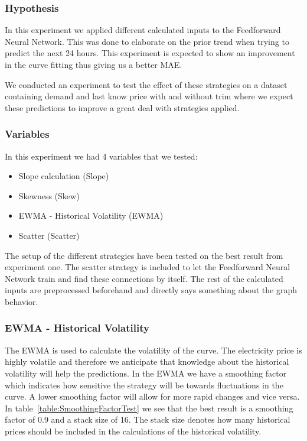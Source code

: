 \subsubsection{Hypothesis}
In this experiment we applied different calculated inputs to the Feedforward Neural Network. This was done to elaborate on the prior trend when trying to predict the next 24 hours. This experiment is expected to show an improvement in the curve fitting thus giving us a better MAE.

We conducted an experiment to test the effect of these strategies on a dataset containing demand and last know price with and without trim where we expect these predictions to improve a great deal with strategies applied.

\subsubsection{Variables}
In this experiment we had 4 variables that we tested:
\begin{itemize}
	\item Slope calculation (Slope)
	\item Skewness (Skew)
	\item EWMA - Historical Volatility (EWMA)
	\item Scatter (Scatter)
\end{itemize}

The setup of the different strategies have been tested on the best result from experiment one. The scatter strategy is included to let the Feedforward Neural Network train and find these connections by itself. The rest of the calculated inputs are preprocessed beforehand and directly says something about the graph behavior.

\subsubsection{EWMA - Historical Volatility}
The EWMA is used to calculate the volatility of the curve. The electricity price is highly volatile and therefore we anticipate that knowledge about the historical volatility will help the predictions. In the EWMA we have a smoothing factor which indicates how sensitive the strategy will be towards fluctuations in the curve. A lower smoothing factor will allow for more rapid changes and vice versa. In table~\ref{table:SmoothingFactorTest} we see that the best result is a smoothing factor of 0.9 and a stack size of 16. The stack size denotes how many historical prices should be included in the calculations of the historical volatility.

